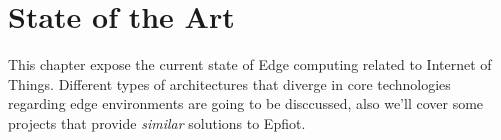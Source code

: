 
\cleardoublepage


\chapter{State of the Art}
\label{makereference2}

This chapter expose the current state of Edge computing related to Internet of Things. Different types of architectures that diverge in core technologies regarding edge environments are going to be disccussed,  also we'll cover some projects that provide \textit{similar} solutions to Epfiot.